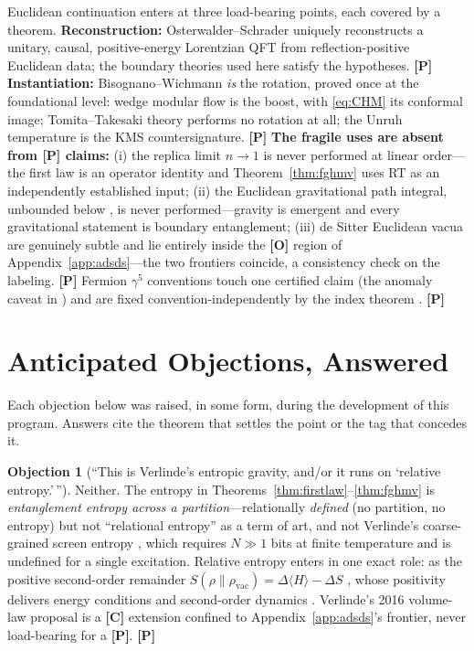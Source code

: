 \documentclass[11pt]{article}
\theoremstyle{definition}
\newtheorem{objection}{Objection}[section]
\newcommand{\pP}{\textbf{[P]}}
\newcommand{\pC}{\textbf{[C]}}
\newcommand{\pO}{\textbf{[O]}}
\begin{document}
Euclidean continuation enters at three load-bearing points, each covered
by a theorem. \textbf{Reconstruction:} Osterwalder--Schrader
\cite{OS1973} uniquely reconstructs a unitary, causal, positive-energy
Lorentzian QFT from reflection-positive Euclidean data; the boundary
theories used here satisfy the hypotheses. \pP{}
\textbf{Instantiation:} Bisognano--Wichmann
\cite{BisognanoWichmann1976} \emph{is} the rotation, proved once at the
foundational level: wedge modular flow is the boost, with
\eqref{eq:CHM} its conformal image; Tomita--Takesaki theory
\cite{Haag1996} performs no rotation at all; the Unruh temperature
\cite{Unruh1976} is the KMS countersignature. \pP{}
\textbf{The fragile uses are absent from \pP{} claims:} (i) the replica
limit $n\to1$ \cite{LM2013} is never performed at linear order---the first
law is an operator identity and Theorem~\ref{thm:fghmv} uses RT as an
independently established input; (ii) the Euclidean gravitational path
integral, unbounded below \cite{GHP1978}, is never performed---gravity is
emergent and every gravitational statement is boundary entanglement;
(iii) de Sitter Euclidean vacua are genuinely subtle and lie entirely
inside the \pO{} region of Appendix~\ref{app:adsds}---the two frontiers
coincide, a consistency check on the labeling. \pP{} Fermion
$\gamma^5$ conventions touch one certified claim (the anomaly caveat in
\cite{McGwier2026b}) and are fixed convention-independently by the index
theorem \cite{Fujikawa1979}. \pP{}

\section{Anticipated Objections, Answered}
\label{app:objections}

Each objection below was raised, in some form, during the development of
this program. Answers cite the theorem that settles the point or the tag
that concedes it.

\begin{objection}[``This is Verlinde's entropic gravity, and/or it runs
on `relative entropy.'\,'']
Neither. The entropy in Theorems~\ref{thm:firstlaw}--\ref{thm:fghmv} is
\emph{entanglement entropy across a partition}---relationally
\emph{defined} (no partition, no entropy) but not ``relational entropy''
as a term of art, and not Verlinde's coarse-grained screen entropy
\cite{Verlinde2011}, which requires $N\gg1$ bits at finite temperature and
is undefined for a single excitation. Relative entropy enters in one exact
role: as the positive second-order remainder
$S(\rho\|\rho_{\mathrm{vac}})=\Delta\langle H\rangle-\Delta S$
\cite{Casini2008,BlancoCasini2013}, whose positivity delivers energy
conditions and second-order dynamics \cite{Faulkner2017}. Verlinde's 2016
volume-law proposal \cite{Verlinde2017} is a \pC{} extension confined to
Appendix~\ref{app:adsds}'s frontier, never load-bearing for a \pP{}. \pP{}
\end{objection}
\end{document}
